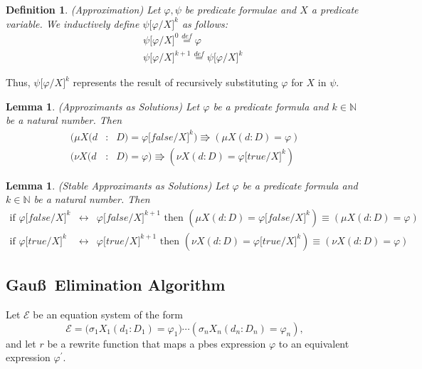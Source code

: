 \documentclass{article}
\newtheorem{definition}[theorem]{Definition}
\newtheorem{lemma}[theorem]{Lemma}
\begin{document}
\begin{definition}
(Approximation) Let $\varphi ,\psi $ be predicate formulae and $X$ a
predicate variable. We inductively define $\psi \lbrack \varphi /X]^{k}$ as
follows:%
\begin{eqnarray*}
&&\psi \lbrack \varphi /X]^{0}\overset{def}{=}\varphi \\
&&\psi \lbrack \varphi /X]^{k+1}\overset{def}{=}\psi \lbrack \varphi /X]^{k}
\end{eqnarray*}
\end{definition}

Thus, $\psi \lbrack \varphi /X]^{k}$ represents the result of recursively
substituting $\varphi $ for $X$ in $\psi $.

\begin{lemma}
(Approximants as Solutions) Let $\varphi $ be a predicate formula and $k\in
\mathbb{N}$ be a natural number. Then%
\begin{eqnarray*}
(\mu X(d &:&D)=\varphi \lbrack false /X]^{k})\Rrightarrow (\mu
X(d:D)=\varphi ) \\
(\nu X(d &:&D)=\varphi )\Rrightarrow (\nu X(d:D)=\varphi \lbrack true
/X]^{k})
\end{eqnarray*}
\end{lemma}

\begin{lemma}
(Stable Approximants as Solutions) Let $\varphi $ be a predicate formula and
$k\in \mathbb{N}$ be a natural number. Then%
\begin{eqnarray*}
\text{if }\varphi \lbrack false /X]^{k} &\longleftrightarrow &\varphi
\lbrack false /X]^{k+1}\text{ then }(\mu X(d:D)=\varphi \lbrack false
/X]^{k})\equiv (\mu X(d:D)=\varphi ) \\
\text{if }\varphi \lbrack true /X]^{k} &\longleftrightarrow &\varphi \lbrack
true /X]^{k+1}\text{ then }(\nu X(d:D)=\varphi \lbrack true /X]^{k})\equiv
(\nu X(d:D)=\varphi )
\end{eqnarray*}
\end{lemma}

\pagebreak

\subsection{Gau\ss\ Elimination Algorithm}

Let $\mathcal{E}$ be an equation system of the form%
\begin{equation*}
\mathcal{E=(}\sigma _{1}X_{1}(d_{1}:D_{1})=\varphi _{1})\cdots (\sigma
_{n}X_{n}(d_{n}:D_{n})=\varphi _{n}),
\end{equation*}%
and let $r$ be a rewrite function that maps a pbes expression $\varphi $ to
an equivalent expression $\varphi ^{\prime }$.
\end{document}
